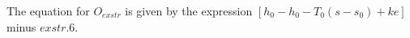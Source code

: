 The equation for \( O_{exstr} \) is given by the expression \( [h_0 - h_0 - T_0 (s - s_0) + ke] \) minus \( exstr.6 \).